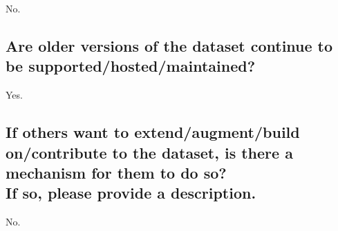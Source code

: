 \documentclass[letterpaper, 10 pt, conference]{ieeeconf}  %
\newcommand{\subtitle}[1]{{\\ \small \normalfont \color{purple} #1}}
\begin{document}
No.

\subsection{Are older versions of the dataset continue to be supported/hosted/maintained?}

Yes.

\subsection{If others want to extend/augment/build on/contribute to the dataset, is there a mechanism for them to do so? \subtitle{If so, please provide a description.}}

No.


\medskip
 
  

\end{document}
